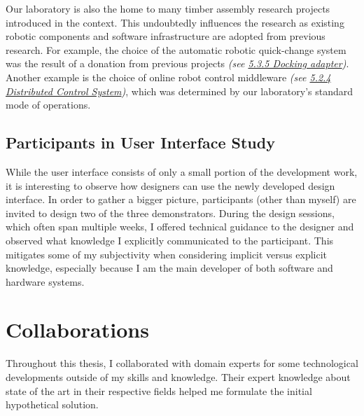 Our laboratory is also the home to many timber assembly research projects introduced in the context. This undoubtedly influences the research as existing robotic components and software infrastructure are adopted from previous research. For example, the choice of the automatic robotic quick-change system was the result of a donation from previous projects \textit{(see \ul{5.3.5 Docking adapter})}. Another example is the choice of online robot control middleware \textit{(see \ul{5.2.4 Distributed Control System})}, which was determined by our laboratory's standard mode of operations.

\subsection{Participants in User Interface Study}
\label{subsection:methodology_participants_in_user_interface_study}

While the user interface consists of only a small portion of the development work, it is interesting to observe how designers can use the newly developed design interface. In order to gather a bigger picture, participants (other than myself) are invited to design two of the three demonstrators. During the design sessions, which often span multiple weeks, I offered technical guidance to the designer and observed what knowledge I explicitly communicated to the participant. This mitigates some of my subjectivity when considering implicit versus explicit knowledge, especially because I am the main developer of both software and hardware systems. 

\section{Collaborations}
\label{section:methodology_collaborations}

Throughout this thesis, I collaborated with domain experts for some technological developments outside of my skills and knowledge. Their expert knowledge about state of the art in their respective fields helped me formulate the initial hypothetical solution. 

